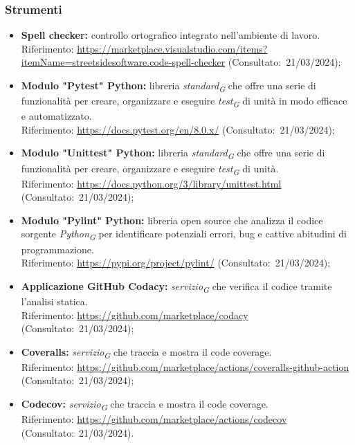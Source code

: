 \hypertarget{subsubsec:strumentiVerifica}{\subsubsection{Strumenti}}
\begin{itemize}
    \item \textbf{Spell checker:} controllo ortografico integrato nell’ambiente di lavoro. \\
    Riferimento: \url{https://marketplace.visualstudio.com/items?itemName=streetsidesoftware.code-spell-checker} (Consultato:~21/03/2024);
    \item \textbf{Modulo "Pytest" Python:} libreria \textit{standard}\textsubscript{\textit{G}} che offre una serie di funzionalità per creare, organizzare e eseguire \textit{test}\textsubscript{\textit{G}} di unità in modo efficace e automatizzato. \\
    Riferimento: \url{https://docs.pytest.org/en/8.0.x/} (Consultato:~21/03/2024);
    \item \textbf{Modulo "Unittest" Python:} libreria \textit{standard}\textsubscript{\textit{G}} che offre una serie di funzionalità per creare, organizzare e eseguire \textit{test}\textsubscript{\textit{G}} di unità. \\
    Riferimento: \url{https://docs.python.org/3/library/unittest.html} (Consultato:~21/03/2024);
    \item \textbf{Modulo "Pylint" Python:} libreria open source che analizza il codice sorgente \textit{Python}\textsubscript{\textit{G}} per identificare potenziali errori, bug e cattive abitudini di programmazione. \\
    Riferimento: \url{https://pypi.org/project/pylint/} (Consultato:~21/03/2024);
    \item \textbf{Applicazione GitHub Codacy:} \textit{servizio}\textsubscript{\textit{G}} che verifica il codice tramite l'analisi statica. \\
    Riferimento: \url{https://github.com/marketplace/codacy} (Consultato:~21/03/2024);
    \item \textbf{Coveralls:} \textit{servizio}\textsubscript{\textit{G}} che traccia e mostra il code coverage. \\
    Riferimento: \url{https://github.com/marketplace/actions/coveralls-github-action} (Consultato:~21/03/2024);
    \item \textbf{Codecov:} \textit{servizio}\textsubscript{\textit{G}} che traccia e mostra il code coverage. \\
    Riferimento: \url{https://github.com/marketplace/actions/codecov} (Consultato:~21/03/2024).
\end{itemize}
